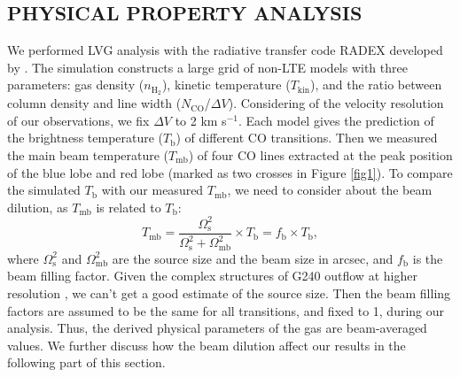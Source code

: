 \subsection{PHYSICAL PROPERTY ANALYSIS}
We performed LVG analysis with the radiative transfer code RADEX developed by \citet{2007A&A...468..627V}. The simulation constructs a large grid of non-LTE models with three parameters: gas density ($n_{\mathrm{H}_2}$), kinetic temperature ($T_{\mathrm{kin}}$), and the ratio between column density and line width ($N_{\mathrm{CO}}$/$\Delta V$). Considering of the velocity resolution of our observations, we fix $\Delta V$ to 2 km s$^{-1}$. Each model gives the prediction of the brightness temperature ($T_\mathrm{b}$) of different CO transitions. Then we measured the main beam temperature ($T_{\mathrm{mb}}$) of four CO lines extracted at the peak position of the blue lobe and red lobe (marked as two crosses in Figure \ref{fig1}). To compare the simulated $T_\mathrm{b}$ with our measured $T_{\mathrm{mb}}$, we need to consider about the beam dilution, as $T_{\mathrm{mb}}$ is related to $T_\mathrm{b}$:
\begin{equation}
T_{\mathrm{mb}} = \frac{\Omega_{\mathrm{s}}^2}{\Omega_{\mathrm{s}}^2+\Omega_{\mathrm{mb}}^2}\times T_\mathrm{b} = f_{\mathrm{b}} \times T_\mathrm{b},
\end{equation}
where $\Omega_{\mathrm{s}}^2$ and $\Omega_{\mathrm{mb}}^2$ are the source size and the beam size in arcsec, and $f_{\mathrm{b}}$ is the beam filling factor. Given the complex structures of G240 outflow at higher resolution \citep{2009ApJ...696...66Q}, we can't get a good estimate of the source size. Then the beam filling factors are assumed to be the same for all transitions, and fixed to 1, during our analysis. Thus, the derived physical parameters of the gas are beam-averaged values. We further discuss how the beam dilution affect our results in the following part of this section.

